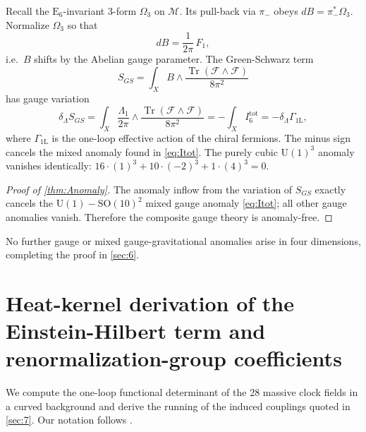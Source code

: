 \documentclass[pdflatex,sn-mathphys-num]{sn-jnl}
\theoremstyle{thmstyleone}
\theoremstyle{thmstyletwo}%
\theoremstyle{thmstylethree}%
\newcommand{\SO}[1]{\mathrm{SO(#1)}}
\newcommand{\U}[1]{\mathrm{U(#1)}}
\newcommand{\E}[1]{\mathrm{E_{#1}}}
\newcommand{\SOTen}{\SO{10}}
\newcommand{\UOne}{\U{1}}
\newcommand{\ESix}{\E{6}}
\newcommand{\Tr}{\operatorname{Tr}}
\begin{document}
\begin{appendices}
Recall the $\ESix$-invariant 3-form \(\Omega_{3}\) on
\(\mathcal M\).  Its pull-back via \(\pi_-\) obeys
\(dB=\pi_-^{*}\Omega_{3}\).  Normalize \(\Omega_{3}\) so that
\[
  dB
  = \frac{1}{2\pi}\,F_{1},
\]
i.e.\ \(B\) shifts by the Abelian gauge parameter.  The Green-Schwarz
term
\begin{equation}\label{eq:GSagain}
  S_{GS}
  = \int_{X}B\wedge
    \frac{\Tr(\mathcal F\wedge\mathcal F)}{8\pi^{2}}
\end{equation}
has gauge variation
\[
  \delta_{\Lambda}S_{GS}
  = \int_{X}
      \frac{\Lambda_{1}}{2\pi}\wedge
      \frac{\Tr(\mathcal F\wedge\mathcal F)}{8\pi^{2}}
  = -\int_{X}I_{6}^{\text{tot}}
  = -\delta_{\Lambda}\Gamma_{\text{1L}},
\]
where \(\Gamma_{\text{1L}}\) is the one-loop effective action of the
chiral fermions.  The minus sign cancels the mixed anomaly found in
\eqref{eq:Itot}. The purely cubic \(\UOne^{3}\) anomaly vanishes
identically:  
\(
16\cdot(1)^{3}+10\cdot(-2)^{3}+1\cdot(4)^{3}=0.
\)

\begin{proof}[Proof of \autoref{thm:Anomaly}]
The anomaly inflow from the variation of \(S_{GS}\) exactly cancels the
\(\UOne-\SOTen^{2}\) mixed gauge anomaly
\eqref{eq:Itot}; all other gauge anomalies vanish.
Therefore the composite gauge theory is anomaly-free.
\end{proof}

\bigskip
No further gauge or mixed gauge-gravitational anomalies arise in four
dimensions, completing the proof in \autoref{sec:6}.

\section{Heat-kernel derivation of the Einstein-Hilbert term
         and renormalization-group coefficients}
\label{app:Gravity}
We compute the one-loop functional determinant of the 28 massive clock
fields in a curved background and derive the running of the induced
couplings quoted in \autoref{sec:7}.  Our notation follows
\cite{Vassilevich:2003}.


\end{appendices}
\end{document}
